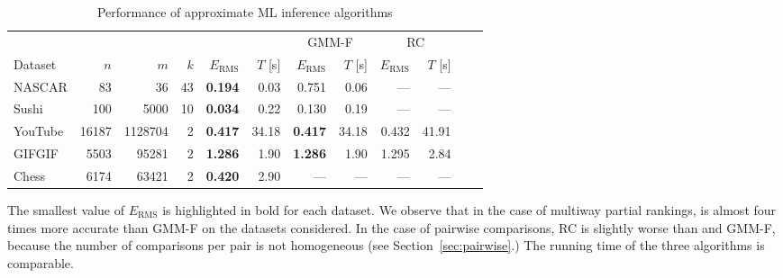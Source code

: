 \begin{table}[ht]
  \vspace{-0.3cm}
  \caption{Performance of approximate ML inference algorithms}
  \label{tab:approxalg}
  \centering
  \small{
  \begin{tabular}{l rrr rr rr rr rr}
    \toprule
            &             &               &          & \multicolumn{2}{c}{\LSR{}}            & \multicolumn{2}{c}{GMM-F}          & \multicolumn{2}{c}{RC} \\
                                                       \cmidrule(l){5-6}                    \cmidrule(l){7-8}                    \cmidrule(l){9-10}
    Dataset &         $n$ &           $m$ &      $k$ &     $E_{\text{RMS}}$ &     $T$ [s] &     $E_{\text{RMS}}$ &     $T$ [s] & $E_{\text{RMS}}$ & $T$ [s] \\
    \midrule
    NASCAR  &    \num{83} &      \num{36} & \num{43} & \bfseries\num{0.194} &  \num{0.03} &          \num{0.751} &  \num{0.06} &         --- &         --- \\
    Sushi   &   \num{100} &    \num{5000} & \num{10} & \bfseries\num{0.034} &  \num{0.22} &          \num{0.130} &  \num{0.19} &         --- &         --- \\
    \addlinespace                                                                                                             
    YouTube & \num{16187} & \num{1128704} &  \num{2} & \bfseries\num{0.417} & \num{34.18} & \bfseries\num{0.417} & \num{34.18} & \num{0.432} & \num{41.91} \\
    GIFGIF  &  \num{5503} &   \num{95281} &  \num{2} & \bfseries\num{1.286} &  \num{1.90} & \bfseries\num{1.286} &  \num{1.90} & \num{1.295} &  \num{2.84} \\
    \addlinespace                                                                                                             
    Chess   &  \num{6174} &   \num{63421} &  \num{2} & \bfseries\num{0.420} &  \num{2.90} &                  --- &         --- &         --- &         --- \\
    \bottomrule
  \end{tabular}
  }
\end{table}

The smallest value of $E_{\text{RMS}}$ is highlighted in bold for each dataset.
We observe that in the case of multiway partial rankings, \LSR{} is almost four times more accurate than GMM-F on the datasets considered.
In the case of pairwise comparisons, RC is slightly worse than \LSR{} and GMM-F, because the number of comparisons per pair is not homogeneous (see Section~\ref{sec:pairwise}.)
The running time of the three algorithms is comparable.

